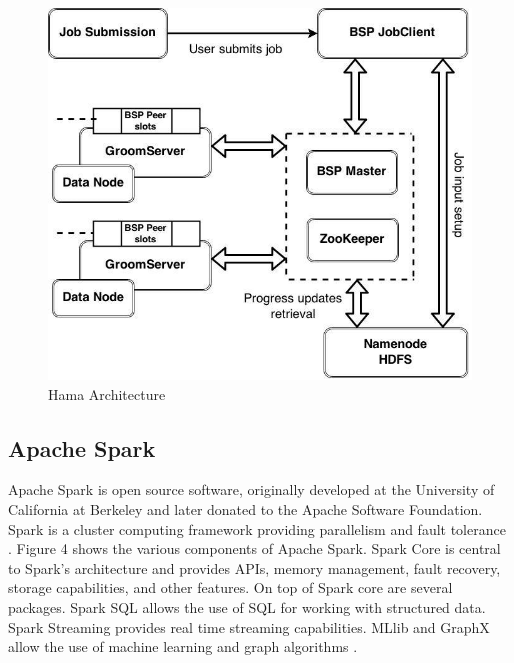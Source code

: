 \documentclass[9pt,twocolumn,twoside]{../../styles/osajnl}
\begin{document}
\begin{figure}[ht]
  \includegraphics[scale=0.35]{images/hama-architecture.jpg}
  \caption{Hama Architecture \cite{apachehama}}
\end{figure}







\subsection{Apache Spark}

Apache Spark is open source software, originally developed at the University of California at Berkeley and later donated to the Apache Software Foundation. Spark is a cluster computing framework providing parallelism and fault tolerance \cite{www-wikispark}.
Figure 4 shows the various components of Apache Spark.  Spark Core is central to Spark's architecture and provides APIs, memory management, fault recovery, storage capabilities, and other features. On top of Spark core are several packages.  Spark SQL allows the use of SQL for working with structured data.  Spark Streaming provides real time streaming capabilities.  MLlib and GraphX allow the use of machine learning and graph algorithms \cite{www-techstory}.
\end{document}
